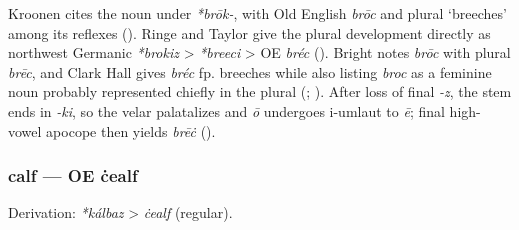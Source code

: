 \documentclass[
  british,
  a4paper,
]{article}
\begin{document}
Kroonen cites the noun under \emph{*brōk-}, with Old English \emph{brōc}
and plural `breeches' among its reflexes
(). Ringe and Taylor give
the plural development directly as northwest Germanic \emph{*brokiz}
\textgreater{} \emph{*breeci} \textgreater{} OE \emph{bréc}
(). Bright
notes \emph{brōc} with plural \emph{brēc}, and Clark Hall gives
\emph{bréc} fp. breeches while also listing \emph{broc} as a feminine
noun probably represented chiefly in the plural
(;
). After loss of final
\emph{-z}, the stem ends in \emph{-ki}, so the velar palatalizes and
\emph{ō} undergoes i-umlaut to \emph{ē}; final high-vowel apocope then
yields \emph{brēċ} ().

\subsubsection{calf --- OE ċealf}\label{calf-oe-ux10bealf}

Derivation: \emph{*kálbaz} \textgreater{} \emph{ċealf} (regular).

\begingroup
\setlength{\fboxsep}{6pt}
\end{document}
